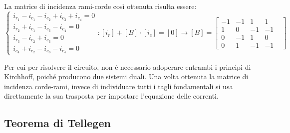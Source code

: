 \documentclass{article}
\numberwithin{equation}{subsection}
\begin{document}
La matrice di incidenza rami-corde così ottenuta risulta essere:
\begin{equation*}
    \begin{cases}
        i_{r_1}-i_{c_1}-i_{c_2}+i_{c_3}+i_{c_4}=0\\
        i_{r_2}+i_{c_1}-i_{c_3}-i_{c_4}=0\\
        i_{r_3}-i_{c_2}+i_{c_3}=0\\
        i_{c_4}+i_{c_2}-i_{c_3}-i_{c_4}=0
    \end{cases}:[i_r]+[B]\cdot[i_c]=[0]\to[B]=
    \begin{bmatrix}
        -1&-1&1&1\\
        1&0&-1&-1\\
        0&-1&1&0\\
        0&1&-1&-1&
    \end{bmatrix}
\end{equation*}

Per cui per risolvere il circuito, non è necessario adoperare entrambi i principi di Kirchhoff, poiché producono due sistemi duali. Una volta ottenuta la matrice di incidenza 
corde-rami, invece di individuare tutti i tagli fondamentali si usa direttamente la sua trasposta per impostare l'equazione delle correnti. 

\subsection{Teorema di Tellegen}
\end{document}
